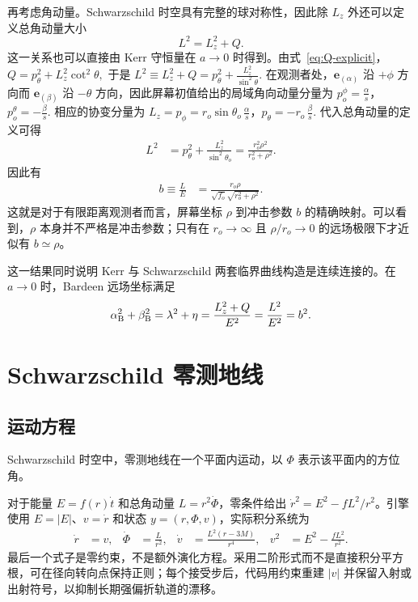 \documentclass[UTF8,11pt,a4paper,fontset=fandol]{ctexart}
\newcommand{\ealpha}{\bm{e}_{(\alpha)}}
\newcommand{\ebeta}{\bm{e}_{(\beta)}}
\begin{document}
再考虑角动量。Schwarzschild 时空具有完整的球对称性，因此除 \(L_z\) 外还可以定义总角动量大小
\begin{equation}
L^2=L_z^2+Q.
\end{equation}
这一关系也可以直接由 Kerr 守恒量在 \(a\to0\) 时得到。由式~\eqref{eq:Q-explicit}，
\(
Q
=p_\theta^2+L_z^2\cot^2\theta,
\)
于是
\(
L^2\equiv L_z^2+Q
=p_\theta^2+\frac{L_z^2}{\sin^2\theta}
.
\)
在观测者处，\(\ealpha\) 沿 \(+\phi\) 方向而 \(\ebeta\) 沿 \(-\theta\) 方向，因此屏幕初值给出的局域角向动量分量为
\(
p_o^{\phi}=\frac{\alpha}{s}
\)，\(
p_o^{\theta}=-\frac{\beta}{s}.
\)
相应的协变分量为
\(
L_z=p_\phi
   =r_o\sin\theta_o\,\frac{\alpha}{s}
\)，\(
p_\theta
   =-r_o\,\frac{\beta}{s}.
\)
代入总角动量的定义可得
\[
\begin{aligned}
L^2
&=p_\theta^2+\frac{L_z^2}{\sin^2\theta_o}=\frac{r_o^2\rho^2}{r_o^2+\rho^2}.
\end{aligned}
\]
因此有
\begin{align}
 b\equiv\frac{L}{E}
 &=\frac{r_o\rho}
 {\sqrt{f_o}\sqrt{r_o^2+\rho^2}}.
 \label{eq:schwarzschild-screen-limit}
\end{align}
这就是对于有限距离观测者而言，屏幕坐标 \(\rho\) 到冲击参数 \(b\) 的精确映射。可以看到，\(\rho\) 本身并不严格是冲击参数；只有在 \(r_o\to\infty\) 且 \(\rho/r_o\to0\) 的远场极限下才近似有 \(b\simeq\rho\)。

这一结果同时说明 Kerr 与 Schwarzschild 两套临界曲线构造是连续连接的。在 \(a\to0\) 时，Bardeen 远场坐标满足
\[
\alpha_{\rm B}^2+\beta_{\rm B}^2
=\lambda^2+\eta
=\frac{L_z^2+Q}{E^2}
=\frac{L^2}{E^2}
=b^2.
\]


\section{Schwarzschild 零测地线}

\subsection{运动方程}

Schwarzschild 时空中，零测地线在一个平面内运动，以 \(\Phi\) 表示该平面内的方位角。


对于能量 \(E=f(r)\dot t\) 和总角动量 \(L=r^2\dot\Phi\)，零条件给出 \(\dot r^2=E^2-fL^2/r^2\)。引擎使用 \(E=|E|\)、\(v=\dot r\) 和状态 \(y=(r,\Phi,v)\)，实际积分系统为
\begin{align}
 \dot r&=v,&\dot\Phi&=\frac{L}{r^2},
 &\dot v&=\frac{L^2(r-3M)}{r^4},
 &v^2&=E^2-\frac{fL^2}{r^2}. \label{eq:swc-engine}
\end{align}
最后一个式子是零约束，不是额外演化方程。采用二阶形式而不是直接积分平方根，可在径向转向点保持正则；每个接受步后，代码用约束重建 \(|v|\) 并保留入射或出射符号，以抑制长期强偏折轨道的漂移。
\end{document}
